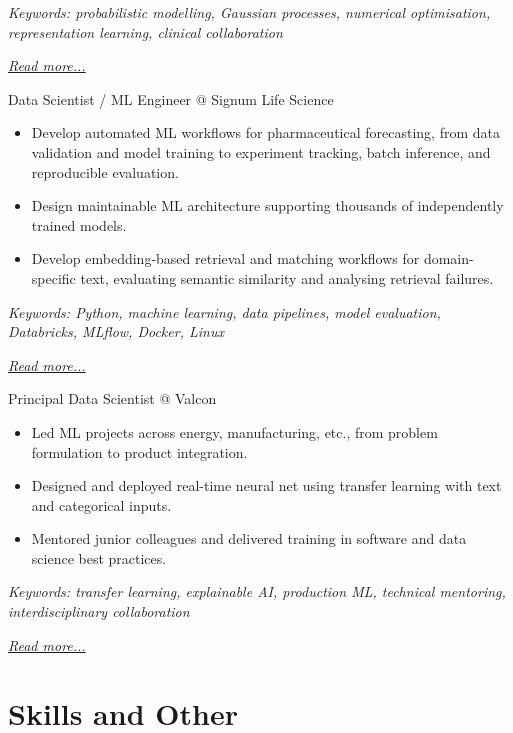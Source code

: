 \documentclass[11pt,a4paper]{moderncv}
\begin{document}
{\footnotesize\textit{Keywords: probabilistic modelling, Gaussian processes, numerical optimisation, representation learning, clinical collaboration}}

\hfill{\small{\textit{\hyperref[sec:raysearch]{Read more...}}}}

\large{Data Scientist / ML Engineer @ Signum Life Science}
\normalsize
\begin{itemize}
    \item Develop automated ML workflows for pharmaceutical forecasting, from data validation and model training to experiment tracking, batch inference, and reproducible evaluation.
    \item Design maintainable ML architecture supporting thousands of independently trained models.
    \item Develop embedding-based retrieval and matching workflows for domain-specific text, evaluating semantic similarity and analysing retrieval failures.
\end{itemize}

{\footnotesize\textit{Keywords: Python, machine learning, data pipelines, model evaluation, Databricks, MLflow, Docker, Linux}}

\hfill{\small{\textit{\hyperref[sec:signum]{Read more...}}}}

\large{Principal Data Scientist @ Valcon}
\normalsize
\begin{itemize}
    \item Led ML projects across energy, manufacturing, etc., from problem formulation to product integration.
    \item Designed and deployed real-time neural net using transfer learning with text and categorical inputs.
    \item Mentored junior colleagues and delivered training in software and data science best practices.
\end{itemize}

{\footnotesize\textit{Keywords: transfer learning, explainable AI, production ML, technical mentoring, interdisciplinary collaboration}}

\hfill{\small{\textit{\hyperref[sec:valcon]{Read more...}}}}


\section{Skills and Other}
\end{document}
